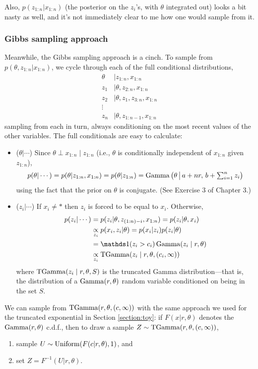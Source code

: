 \documentclass[12pt]{article}
\begin{document}
Also, $p(z_{1:n}|x_{1:n})$ (the posterior on the $z_i$'s, with $\theta$ integrated out) looks a bit nasty as well, and it's not immediately clear to me how one would sample from it.


\subsubsection{Gibbs sampling approach}
Meanwhile, the Gibbs sampling approach is a cinch. To sample from $p(\theta,z_{1:n}|x_{1:n})$, we cycle through each of the full conditional distributions,
\begin{align*}
\theta &\mid z_{1:n}, x_{1:n}\\
z_1 &\mid \theta, z_{2:n}, x_{1:n}\\
z_2 &\mid \theta, z_1,z_{3:n}, x_{1:n}\\
\vdots\\
z_n &\mid \theta, z_{1:n-1}, x_{1:n}
\end{align*}
sampling from each in turn, always conditioning on the most recent values of the other variables.
The full conditionals are easy to calculate:
\begin{itemize}
\item ($\theta|\cdots$) Since $\theta \perp x_{1:n}\mid z_{1:n}$ (i.e., $\theta$ is conditionally independent of $x_{1:n}$ given $z_{1:n}$),
$$p(\theta|\cdots) = p(\theta|z_{1:n},x_{1:n}) = p(\theta|z_{1:n}) = \operatorname*{Gamma}\big(\theta\,\big\vert\, a+nr,\, b+\textstyle\sum_{i=1}^n z_i\big)$$
using the fact that the prior on $\theta$ is conjugate. (See Exercise 3 of Chapter 3.)
\item ($z_i|\cdots$) If $x_i\neq \ast$ then $z_i$ is forced to be equal to $x_i$. Otherwise,
\begin{align*}
p(z_i|\cdots) &= p(z_i|\theta,z_{(1:n) - i}, x_{1:n}) = p(z_i|\theta,x_i) \\
&\underset{z_i}{\propto} p(x_i,z_i|\theta) = p(x_i|z_i) p(z_i|\theta)\\
& =\I(z_i>c_i)\Ga(z_i\mid r,\theta)\\
& \underset{z_i}{\propto} \TGamma(z_i\mid r,\theta,(c_i,\infty))
\end{align*}
where $\operatorname*{TGamma}(z_i\mid r,\theta,S)$ is the truncated Gamma distribution---that is, the distribution of a $\operatorname*{Gamma}(r,\theta)$ random variable conditioned on being in the set $S$.
\end{itemize}
We can sample from $\operatorname*{TGamma}(r,\theta,(c,\infty))$ with the same approach we used for the truncated exponential in Section \ref{section:toy}: if $F(x|r,\theta)$ denotes the $\operatorname*{Gamma}(r,\theta)$ c.d.f., then to draw a sample $Z\sim\operatorname*{TGamma}(r,\theta,(c,\infty))$,
\begin{enumerate}
\item sample $U\sim\operatorname*{Uniform}(F(c|r,\theta),1)$, and
\item set $Z = F^{-1}(U|r,\theta)$.
\end{enumerate}
\end{document}
